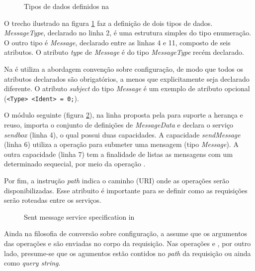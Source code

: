 \vspace{6mm}

\begin{figure}[h]
\begin{small}

\vspace{-.5cm}
\end{small} 
\caption{Tipos de dados definidos na \neoidl}
\label{lst:messagedata-neo}
\end{figure}

O trecho ilustrado na figura \ref{lst:messagedata-neo} faz a definição de dois
tipos de dados. \emph{MessageType}, declarado no linha 2, é uma estrutura
simples do tipo enumeração. O outro tipo é \emph{Message}, declarado entre as
linhas 4 e 11, composto de seis atributos. O atributo \emph{type} de
\emph{Message} é do tipo \emph{MessageType} recém declarado.

Na \neoidl{} é utiliza a abordagem convenção sobre configuração, de modo que
todos os atributos declarados são obrigatórios, a menos que explicitamente
seja declarado diferente. O atributo \emph{subject} do tipo \emph{Message} é um
exemplo de atributo opcional (\texttt{<Type> <Ident> = 0;}).

O módulo seguinte (figura \ref{lst:sentmessage-neo}), na linha proposta pela
\neoidl{} para suporte a herança e reuso, importa o conjunto de definições de \emph{MessageData} e declara o
serviço \emph{sendbox} (linha 4), o qual possui duas capacidades. A
capacidade \emph{sendMessage} (linha 6) utiliza a operação  para submeter uma
mensagem (tipo \emph{Message}). A outra capacidade (linha 7) tem a finalidade de
listas as mensagens com um determinado sequecial, por meio da operação
.

Por fim, a instrução \emph{path} indica o caminho (URI) onde as
operações serão disponibilizadas. Esse atribuito é importante para se definir
como as requisições serão roteadas entre os serviços.

\vspace{6mm}

\begin{figure}[htb]
\begin{small}

\end{small}
\caption{Sent message service specification in \neoidl}
\label{lst:sentmessage-neo}
\end{figure}

Ainda na filosofia de conversão sobre configuração, a \neoidl{} assume que os
argumentos das operações  e  são enviadas no corpo da
requisição. Nas operações  e , por outro lado,
presume-se que os agumentos estão contidos no \emph{path} da requisição ou ainda
como \textit{query string}.

